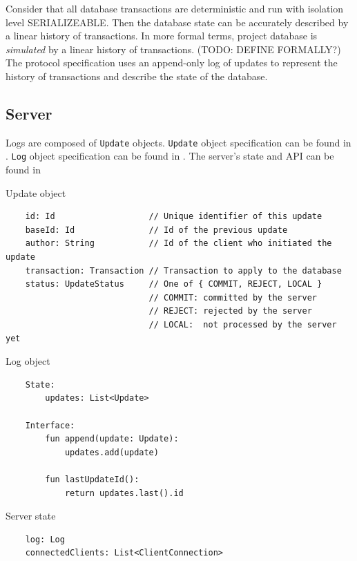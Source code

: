 \documentclass[a4paper, 11pt, oneside]{article}
\theoremstyle{definition}
\begin{document}
Consider that all database transactions are deterministic and run with isolation level SERIALIZEABLE. Then the database state can be accurately described by a linear history of transactions. In more formal terms, project database is \textit{simulated} by a linear history of transactions. (TODO: DEFINE FORMALLY?) The protocol specification uses an append-only log of updates to represent the history of transactions and describe the state of the database.

\subsection{Server}

Logs are composed of \verb|Update| objects. \verb|Update| object specification can be found in . \verb|Log| object specification can be found in . The server's state and API can be found in 

\begin{algorithm}
    \caption{Update object}\label{alg:update}
    \begin{verbatim}
    id: Id                   // Unique identifier of this update
    baseId: Id               // Id of the previous update
    author: String           // Id of the client who initiated the update
    transaction: Transaction // Transaction to apply to the database
    status: UpdateStatus     // One of { COMMIT, REJECT, LOCAL }
                             // COMMIT: committed by the server
                             // REJECT: rejected by the server
                             // LOCAL:  not processed by the server yet
    \end{verbatim}
\end{algorithm}

\begin{algorithm}
    \caption{Log object}\label{alg:log}
    \begin{verbatim}
    State:
        updates: List<Update>
    
    Interface:
        fun append(update: Update):
            updates.add(update)

        fun lastUpdateId():
            return updates.last().id

    \end{verbatim}
\end{algorithm}

\begin{algorithm}
    \caption{Server state}\label{alg:server-state}
    \begin{verbatim}
    log: Log
    connectedClients: List<ClientConnection>
    \end{verbatim}
\end{algorithm}
\end{document}
